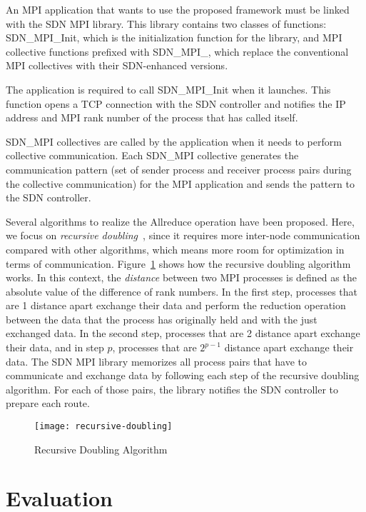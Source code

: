 An MPI application that wants to use the proposed framework must be linked
with the SDN MPI library. This library contains two classes of functions:
SDN\_MPI\_Init, which is the initialization function for the library, and
MPI collective functions prefixed with SDN\_MPI\_, which replace the
conventional MPI collectives with their SDN-enhanced versions.

The application is required to call SDN\_MPI\_Init when it launches. This
function opens a TCP connection with the SDN controller and notifies the IP
address and MPI rank number of the process that has called itself.

SDN\_MPI collectives are called by the application when it needs to perform
collective communication. Each SDN\_MPI collective generates the communication
pattern (set of sender process and receiver process pairs during the
collective communication) for the MPI application and sends the pattern to the
SDN controller.

Several algorithms to realize the Allreduce operation have been proposed.
Here, we focus on \emph{recursive doubling}~\autocite{Thakur2005}, since it
requires more inter-node communication compared with other algorithms, which
means more room for optimization in terms of communication.
Figure~\ref{fig:recursive-doubling} shows how the recursive doubling algorithm
works. In this context, the \emph{distance} between two MPI processes is
defined as the absolute value of the difference of rank numbers. In the first
step, processes that are 1 distance apart exchange their data and perform the
reduction operation between the data that the process has originally held and
with the just exchanged data. In the second step, processes that are 2
distance apart exchange their data, and in step \(p\), processes that are
\(2^{p - 1}\) distance apart exchange their data. The SDN MPI
library memorizes all process pairs that have to communicate and exchange data
by following each step of the recursive doubling algorithm. For each of those
pairs, the library notifies the SDN controller to prepare each route.

\begin{figure}
    \centering
    \texttt{[image: recursive-doubling]}
    \caption{Recursive Doubling Algorithm}%
    \label{fig:recursive-doubling}
\end{figure}

\section{Evaluation}\label{sec:iii-evaluation}

